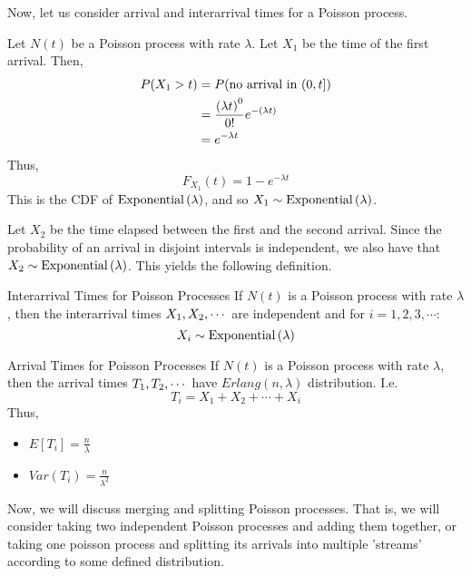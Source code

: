Now, let us consider arrival and interarrival times for a Poisson process. 
\begin{exmp}{}{}
Let \(N(t)\) be a Poisson process with rate \(\lambda\). Let \(X_1\) be the time of the first arrival. Then,
\begin{align*}
  P(X_1 > t) &= P(\textrm{no arrival in \((0,t]\)})\\
  &= \dfrac{{(\lambda t)}^{0}}{0 !} e^{- {(\lambda t)}}\\
  &= e^{-\lambda t}
\end{align*}
Thus,
\begin{equation*}
  F_{X_1}(t) = 1 - e^{-\lambda t}
\end{equation*}
This is the CDF of \(\text{Exponential}\left( \lambda \right)\), and so \(X_1 \sim \text{Exponential}\left(  \lambda  \right)\). \newline 

Let \(X_2\) be the time elapsed between the first and the second arrival. Since the probability of an arrival in disjoint intervals is independent, we also have that \(X_2 \sim \text{Exponential}\left(  \lambda  \right)\). This yields the following definition.

\end{exmp}
\begin{defn}{Interarrival Times for Poisson Processes}{}
If \(N(t)\) is a Poisson process with rate \( \lambda \), then the interarrival times \( X_1, X_2, \cdots \) are independent and for \(i = 1, 2, 3, \cdots \):
\begin{equation*}
  X_i \sim \text{Exponential}\left(  \lambda  \right)
\end{equation*}

\end{defn}

\begin{defn}{Arrival Times for Poisson Processes}{}
If \(N(t)\) is a Poisson process with rate \( \lambda \), then the arrival times \(T_1, T_2, \cdots\) have \(Erlang(n, \lambda)\) distribution. I.e.
\begin{equation*}
  T_i = X_1 + X_2 + \cdots + X_i
\end{equation*}
Thus,
\begin{itemize}
  \item \(E[T_i] = \frac{n}{\lambda}\)
  \item \(Var(T_i) = \frac{n}{\lambda^2}\)
\end{itemize}


\end{defn}

Now, we will discuss merging and splitting Poisson processes. That is, we will consider taking two independent Poisson processes and adding them together, or taking one poisson process and splitting its arrivals into multiple 'streams' according to some defined distribution.

